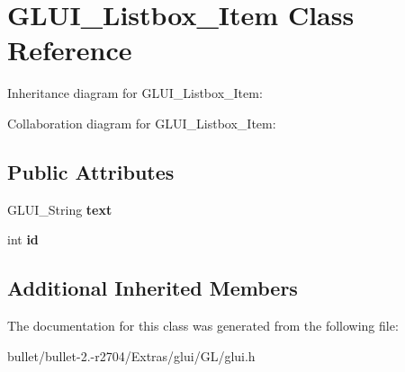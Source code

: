\hypertarget{class_g_l_u_i___listbox___item}{\section{G\+L\+U\+I\+\_\+\+Listbox\+\_\+\+Item Class Reference}
\label{class_g_l_u_i___listbox___item}
}


Inheritance diagram for G\+L\+U\+I\+\_\+\+Listbox\+\_\+\+Item\+:


Collaboration diagram for G\+L\+U\+I\+\_\+\+Listbox\+\_\+\+Item\+:
\subsection*{Public Attributes}
\begin{DoxyCompactItemize}
\item 
\hypertarget{class_g_l_u_i___listbox___item_a93ab7eacdaf81a43b07b89e60bc5edbe}{G\+L\+U\+I\+\_\+\+String {\bfseries text}}\label{class_g_l_u_i___listbox___item_a93ab7eacdaf81a43b07b89e60bc5edbe}

\item 
\hypertarget{class_g_l_u_i___listbox___item_a82c3decf8704010c91232ad6e2ea95d9}{int {\bfseries id}}\label{class_g_l_u_i___listbox___item_a82c3decf8704010c91232ad6e2ea95d9}

\end{DoxyCompactItemize}
\subsection*{Additional Inherited Members}


The documentation for this class was generated from the following file\+:\begin{DoxyCompactItemize}
\item 
bullet/bullet-\/2.-\/r2704/\+Extras/glui/\+G\+L/glui.\+h\end{DoxyCompactItemize}
